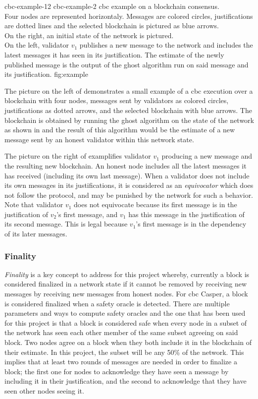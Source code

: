 \doublefigure
    {cbc-example-12}
    {cbc-example-2}
    {\gls{cbc} example on a blockchain consensus.\\
    Four nodes are represented horizontaly. Messages are colored circles,
    justifications are dotted lines and the selected blockchain is pictured as
    blue arrows. \\
    On the right, an initial state of the network is pictured.\\
    On the left, validator \(v_1\) publishes a new message to the network and
    includes the latest messages it has seen in its justification. The estimate
    of the newly published message is the output of the \gls{ghost} algorithm
    run on said message and its justification.
    }
    {fig:example}

The picture on the left of  demonstrates a small example of a
\gls{cbc} execution over a blockchain with four nodes, messages sent by
validators as colored circles, justifications as dotted arrows, and the selected
blockchain with blue arrows.  The blockchain is obtained by running the
\gls{ghost} algorithm on the state of the network as shown in 
and the result of this algorithm would be the estimate of a new message sent by
an honest validator within this network state. 

The picture on the right of  examplifies validator \(v_1\)
producing a new message and the resulting new blockchain. An honest node
includes all the latest messages it has received (including its own last
message).  When a validator does not include its own messages in its
justifications, it is considered as an \textit{equivocator} which does not
follow the protocol, and may be punished by the network for such a behavior.
Note that validator \(v_1\) does not equivocate because its first message is in
the justification of \(v_2\)'s first message, and \(v_1\) has this message in
the justification of its second message. This is legal because \(v_1\)'s first
message is in the dependency of its later messages.

\subsubsection{Finality}
\label{ssec:finality}
\textit{Finality} is a key concept to address for this project whereby,
currently a block is considered finalized in a network state if it cannot be
removed by receiving new messages by receiving new messages from honest nodes.
For \gls{cbc} Casper, a block is considered finalized when a safety oracle is
detected. There are multiple parameters and ways to compute safety oracles and
the one that has been used for this project is that a block is considered safe
when every node in a subset of the network has seen each other member of the
same subset agreeing on said block. Two nodes agree on a block when they both
include it in the blockchain of their estimate. In this project, the subset will
be any 50\% of the network. This implies that at least two rounds of messages
are needed in order to finalize a block; the first one for nodes to acknowledge
they have seen a message by including it in their justification, and the second
to acknowledge that they have seen other nodes seeing it.


